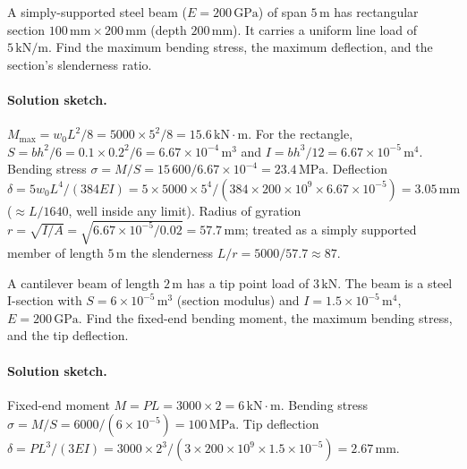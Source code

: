 \begin{exercise}
A simply-supported steel beam ($E = 200\,\text{GPa}$) of span $5\,
\si{\meter}$ has rectangular section $100\,\si{\milli\meter} \times
200\,\si{\milli\meter}$ (depth $200\,\si{\milli\meter}$). It carries
a uniform line load of $5\,\text{kN}/\text{m}$. Find the maximum
bending stress, the maximum deflection, and the section's
slenderness ratio.

\paragraph{Solution sketch.} $M_{\max} = w_0L^2/8 = 5000\times 5^2/8 =
15.6\,\text{kN}\cdot\text{m}$. For the rectangle, $S = bh^2/6 =
0.1\times 0.2^2/6 = 6.67\times 10^{-4}\,\si{\meter\cubed}$ and $I =
bh^3/12 = 6.67\times 10^{-5}\,\si{\meter\tothe{4}}$. Bending stress
$\sigma = M/S = 15\,600/6.67\times 10^{-4} = 23.4\,\text{MPa}$.
Deflection $\delta = 5w_0L^4/(384EI) = 5\times 5000\times 5^4/(384
\times 200\times 10^9 \times 6.67\times 10^{-5}) = 3.05\,\si{\milli
\meter}$ ($\approx L/1640$, well inside any limit). Radius of gyration
$r = \sqrt{I/A} = \sqrt{6.67\times 10^{-5}/0.02} = 57.7\,\si{\milli
\meter}$; treated as a simply supported member of length $5\,\si{\meter}$
the slenderness $L/r = 5000/57.7 \approx 87$.
\end{exercise}

\begin{exercise}
A cantilever beam of length $2\,\si{\meter}$ has a tip point load
of $3\,\text{kN}$. The beam is a steel I-section with $S = 6 \times
10^{-5}\,\si{\meter\cubed}$ (section modulus) and $I = 1.5 \times
10^{-5}\,\si{\meter\tothe{4}}$, $E = 200\,\text{GPa}$. Find the
fixed-end bending moment, the maximum bending stress, and the tip
deflection.

\paragraph{Solution sketch.} Fixed-end moment $M = PL = 3000\times 2 =
6\,\text{kN}\cdot\text{m}$. Bending stress $\sigma = M/S = 6000/(6\times
10^{-5}) = 100\,\text{MPa}$. Tip deflection $\delta = PL^3/(3EI) =
3000\times 2^3/(3\times 200\times 10^9 \times 1.5\times 10^{-5}) =
2.67\,\si{\milli\meter}$.
\end{exercise}

